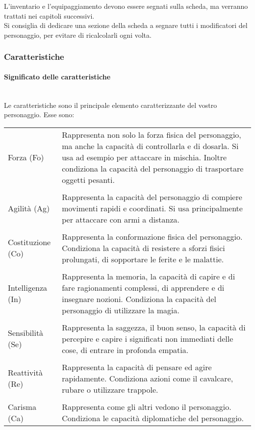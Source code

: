 \documentclass[../manuale_main.tex]{subfiles}
\begin{document}
L'inventario e l'equipaggiamento devono essere segnati sulla scheda, ma verranno trattati nei capitoli successivi.\\
Si consiglia di dedicare una sezione della scheda a segnare tutti i modificatori del personaggio, per evitare di ricalcolarli ogni volta.


\clearpage

\subsubsection{Caratteristiche}

\paragraph{Significato delle caratteristiche}\mbox{}\\
Le caratteristiche sono il principale elemento caratterizzante del vostro personaggio. Esse sono:

\begin{center}
\renewcommand{\arraystretch}{1.2}
\begin{tabularx}{\linewidth}{ l X }
Forza (Fo) &Rappresenta non solo la forza fisica del personaggio, ma anche la capacità di controllarla e di dosarla. Si usa ad esempio per attaccare in mischia. Inoltre condiziona la capacità del personaggio di trasportare oggetti pesanti.\\
&\\
Agilità (Ag)&Rappresenta la capacità del personaggio di compiere movimenti rapidi e coordinati. Si usa principalmente per attaccare con armi a distanza.\\
&\\
Costituzione (Co)&Rappresenta la conformazione fisica del personaggio. Condiziona la capacità di resistere a sforzi fisici prolungati, di sopportare le ferite e le malattie.\\
&\\
Intelligenza (In)&Rappresenta la memoria, la capacità di capire e di fare ragionamenti complessi, di apprendere e di insegnare nozioni. Condiziona la capacità del personaggio di utilizzare la magia.\\
&\\
Sensibilità (Se)&Rappresenta la saggezza, il buon senso, la capacità di percepire e capire i significati non immediati delle cose, di entrare in profonda empatia.\\
&\\
Reattività (Re)&Rappresenta la capacità di pensare ed agire rapidamente. Condiziona azioni come il cavalcare, rubare o utilizzare trappole.\\
&\\
Carisma (Ca)& Rappresenta come gli altri vedono il personaggio. Condiziona le capacità diplomatiche del personaggio.\\
\end{tabularx}
\end{center}
\end{document}
